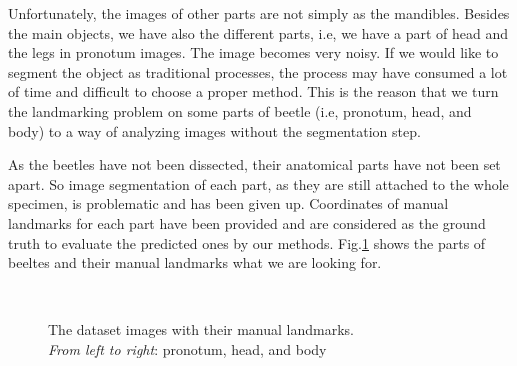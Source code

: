 \documentclass[12pt,a4paper]{article}
\begin{document}
Unfortunately, the images of other parts are not simply as the mandibles. Besides the main objects, we have also the different parts, i.e, we have a part of head and the legs in pronotum images. The image becomes very noisy. If we would like to segment the object as traditional processes, the process may have consumed a lot of time and difficult to choose a proper method. This is the reason that we turn the landmarking problem on some parts of beetle (i.e, pronotum, head, and body) to a way of analyzing images without the segmentation step. 

As the beetles have not been dissected, their anatomical parts have not been set apart. So image segmentation of each part, as they are still attached to the whole specimen, is problematic and has been given up. Coordinates of manual landmarks for each part have been provided and are considered as the ground truth to evaluate the predicted ones by our methods. Fig.\ref{figintro} shows the parts of beeltes and their manual landmarks what we are looking for. 

\begin{figure}[h!]
\centering
{}~~
~~
\caption{The dataset images with their manual landmarks.\\
		 \textit{From left to right}: pronotum, head, and body}
\label{figintro}
\end{figure}
\end{document}
